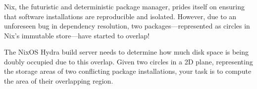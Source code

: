 \begin{frame}
    \frametitle{\problemtitle}

    \begin{columns}
        \begin{column}[T]{.70\textwidth}
            \begin{itemize}
Nix, the futuristic and deterministic package manager, prides itself on ensuring that software installations are reproducible and isolated. However, due to an unforeseen bug in dependency resolution, two packages—represented as circles in Nix’s immutable store—have started to overlap!

The NixOS Hydra build server needs to determine how much disk space is being doubly occupied due to this overlap. Given two circles in a 2D plane, representing the storage areas of two conflicting package installations, your task is to compute the area of their overlapping region.
            \end{itemize}



        \end{column}

    \end{columns}
\end{frame}
